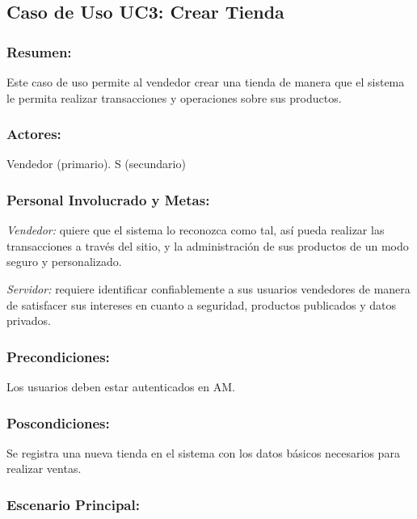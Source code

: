 \subsection{Caso de Uso UC3: Crear Tienda}

\begin{framed}


\subsubsection{Resumen:} Este caso de uso permite al vendedor crear una tienda de manera que el sistema le permita realizar transacciones y operaciones sobre sus productos.


\subsubsection{Actores:} Vendedor (primario). S (secundario)

\subsubsection{Personal Involucrado y Metas:}

\emph{Vendedor:} quiere que el sistema lo reconozca como tal, así pueda realizar las transacciones a través del sitio, y la administración de sus productos de un modo seguro y personalizado.

\emph{Servidor:} requiere identificar confiablemente a sus usuarios vendedores de manera de satisfacer sus intereses en cuanto a seguridad, productos publicados y datos privados. 

\subsubsection{Precondiciones:} 
Los usuarios deben estar autenticados en AM. 

\subsubsection{Poscondiciones:} 
Se registra una nueva tienda en el sistema con los datos básicos necesarios para realizar ventas.

\subsubsection{Escenario Principal: }


\end{framed}
